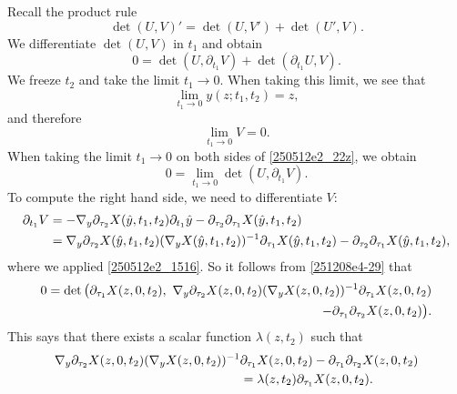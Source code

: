 \documentclass{article}
\numberwithin{equation}{section}
\theoremstyle{plain}
\begin{document}
 
 Recall the product rule 
 \begin{equation}
 \det(U, V)' = \det(U, V') + \det(U', V).
 \end{equation}
We differentiate $\det(U, V)$ in $t_1$ and obtain 
\begin{equation}\label{250512e2_22z}
    0= \det(U, \partial_{t_1} V)+  \det(\partial_{t_1}U, V).
\end{equation}
We freeze $t_2$ and take the limit $t_1\to 0$. When taking this limit, we see that 
\begin{equation}\label{251003e10_25zz}
\lim_{t_1\to 0} y(z; t_1, t_2)= z,
\end{equation}
and therefore 
\begin{equation}
\lim_{t_1\to 0}V  = 0.
\end{equation}
When taking the limit $t_1\to 0$ on both sides of \eqref{250512e2_22z}, we obtain 
\begin{equation}\label{251208e4-29}
0=\lim_{t_1\to 0} \det(U, \partial_{t_1} V).
\end{equation}
 To compute the right hand side, we need to differentiate $V$: 
\begin{align}
    \partial_{t_1} V
    &=-\nabla_y \partial_{\tau_2} X(\hat{y}, t_1, t_2) \partial_{t_1} \hat{y}- \partial_{\tau_2}\partial_{\tau_1} X(\hat{y}, t_1, t_2)\notag\\
     &= \nabla_y \partial_{\tau_2} X(\hat{y}, t_1, t_2)  (\nabla_y X(\hat{y}, t_1, t_2))^{-1} \partial_{\tau_1} X(\hat{y}, t_1, t_2) - \partial_{\tau_2}\partial_{\tau_1} X(\hat{y}, t_1, t_2),
\end{align}
where we applied \eqref{250512e2_1516}. 
So it follows from \eqref{251208e4-29} that
\begin{align}\label{eq: expr 2}
    0= 
    \det\big(\partial_{\tau_1} X(z, 0, t_2),\ \nabla_y \partial_{\tau_2} X(z, 0, t_2)  
     (\nabla_y X(z, 0, t_2))^{-1} \partial_{\tau_1} X(z, 0, t_2)\notag\\ - \partial_{\tau_1} \partial_{\tau_2} X(z, 0, t_2)\big).
\end{align}
This says that there exists a scalar function $\lambda(z,t_2)$ such that
\begin{align}\label{251208e4-32}
    \nabla_y \partial_{\tau_2} X(z, 0, t_2)  
     (\nabla_y X(z, 0, t_2))^{-1}& \partial_{\tau_1} X(z, 0, t_2) - \partial_{\tau_1} \partial_{\tau_2} X(z, 0, t_2)\notag\\
     &= \lambda(z,t_2)\partial_{\tau_1} X(z, 0, t_2).
\end{align}
\end{document}

